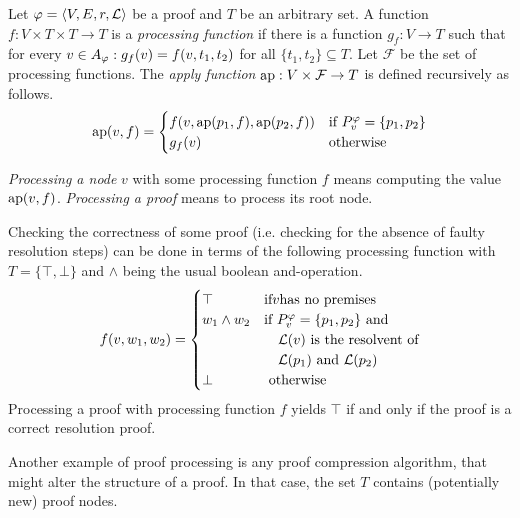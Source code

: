 \begin{definition}
\label{def:proof-processing}

Let $\varphi = \langle V,E,r,\mathcal{L} \rangle$ be a proof and $T$ be an arbitrary set.
A function $f: V \times T \times T \rightarrow T$ is a \emph{processing function} if there is a function $g_f: V \rightarrow T$ such that for every $v \in A_{\varphi}: g_f(v) = f(v,t_1,t_2)$ for all $\{t_1,t_2\} \subseteq T$.
Let $\mathcal{F}$ be the set of processing functions.
The \emph{apply function} $\operatorname{ap}: V \times \mathcal{F} \rightarrow T$ is defined recursively as follows.
$$
\operatorname{ap}(v,f) = 
\begin{cases}
	f(v,\operatorname{ap}(p_1,f),\operatorname{ap}(p_2,f)) &\text{if } P_{v}^{\varphi} = \{p_1,p_2\} \\
	g_f(v) &\text{otherwise}\\
\end{cases}
$$

\emph{Processing a node} $v$ with some processing function $f$ means computing the value $\operatorname{ap}(v,f)$.
\emph{Processing a proof} means to process its root node.

\end{definition}

\begin{example}

Checking the correctness of some proof (i.e. checking for the absence of faulty resolution steps) can be done in terms of the following processing function with $T = \{\top,\bot\}$ and $\wedge$ being the usual boolean and-operation.
$$
f(v,w_1,w_2) = 
\begin{cases}
	\top & \text{if} v \text{has no premises} \\
	w_1 \wedge w_2 &\text{if } P_{v}^{\varphi} = \{p_1,p_2\} \text{ and}\\
								 &\quad \mathcal{L}(v) \text{ is the resolvent of} \\
								 &\quad \mathcal{L}(p_1) \text{ and } \mathcal{L}(p_2)\\
	\bot & \text{ otherwise}
\end{cases}
$$
Processing a proof with processing function $f$ yields $\top$ if and only if the proof is a correct resolution proof.
\end{example}

Another example of proof processing is any proof compression algorithm, that might alter the structure of a proof.
In that case, the set $T$ contains (potentially new) proof nodes.